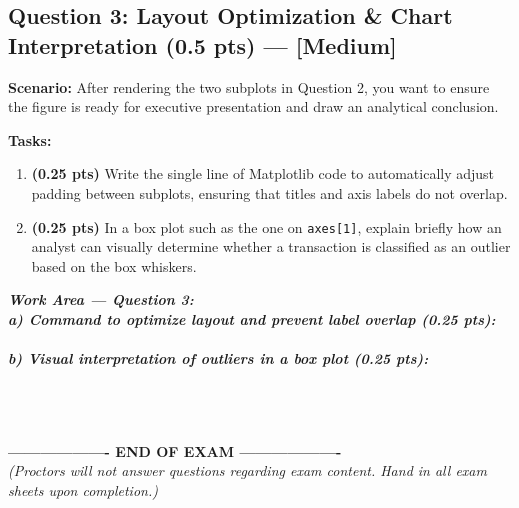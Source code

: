 \documentclass[11pt,a4paper]{article}
\newcommand{\answerbox}[2]{
  \vspace{1mm}
  \begin{tcolorbox}[
    colback=white,
    colframe=gray!60,
    boxrule=0.6pt,
    arc=2pt,
    height=#1,
    left=3mm, right=3mm, top=2mm, bottom=2mm
  ]
  \small\textit{\color{gray}#2}
  \end{tcolorbox}
  \vspace{1mm}
}
\begin{document}
\newpage
\subsection*{Question 3: Layout Optimization \& Chart Interpretation (0.5 pts) --- [Medium]}

\noindent
\textbf{Scenario:} After rendering the two subplots in Question 2, you want to ensure the figure is ready for executive presentation and draw an analytical conclusion.

\noindent
\textbf{Tasks:}
\begin{enumerate}[label=\textbf{\alph*)}]
  \item \textbf{(0.25 pts)} Write the single line of Matplotlib code to automatically adjust padding between subplots, ensuring that titles and axis labels do not overlap.
  \item \textbf{(0.25 pts)} In a box plot such as the one on \texttt{axes[1]}, explain briefly how an analyst can visually determine whether a transaction is classified as an outlier based on the box whiskers.
\end{enumerate}

\answerbox{10.0cm}{
\textbf{Work Area --- Question 3:}\\[3mm]
\textbf{a) Command to optimize layout and prevent label overlap (0.25 pts):}\\[2mm]
\dotfill\\[8mm]
\textbf{b) Visual interpretation of outliers in a box plot (0.25 pts):}\\[3mm]
\dotfill\\[4mm]
\dotfill\\[4mm]
\dotfill\\[4mm]
\dotfill
}

\vspace{5mm}
\begin{center}
\textbf{------------------- END OF EXAM -------------------}\\
\textit{\small (Proctors will not answer questions regarding exam content. Hand in all exam sheets upon completion.)}
\end{center}
\end{document}
